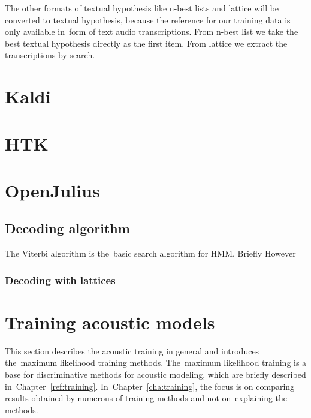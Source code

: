 The other formats of textual hypothesis like n-best lists and lattice
will be converted to textual hypothesis, because the reference for our training data is only available  
in~form of text audio transcriptions.
From n-best list we take the best textual hypothesis directly as the first item. From lattice
we extract the transcriptions by search.  


\section{Kaldi}
\label{sec:back_kaldi}

\section{\ac{HTK}}
\label{sec:back_htk}

\section{OpenJulius}
\label{sec:back_julius}


\subsection*{Decoding algorithm}
\label{sub:dec_algorithm}
The Viterbi algorithm is the~basic search algorithm for \ac{HMM}. 
Briefly
However


\subsubsection{Decoding with lattices}
\label{sub:lattice}





\section{Training acoustic models} 
\label{sec:train_ml}

This section describes the acoustic training in general and introduces the~maximum likelihood training methods.
The~maximum likelihood training is a base for discriminative methods for acoustic modeling, which are briefly
described in~Chapter~\ref{ref:training}.
In~Chapter~\ref{cha:training}, the focus is on comparing results obtained by numerous of training methods
and not on~explaining the methods.

